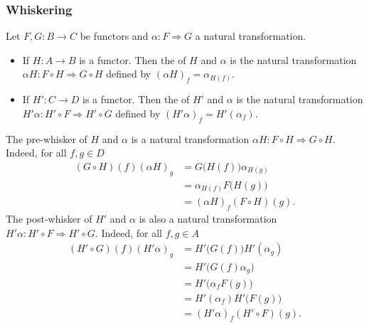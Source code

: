 \subsubsection{Whiskering}
\begin{definition}
Let $F,G: B\to C$ be functors and $\alpha: F\Rightarrow G$ a natural transformation.
\begin{itemize}
\item If $H: A\to B$ is a functor. Then the  of $H$ and $\alpha$ is the natural transformation $\alpha H: F\circ H\Rightarrow G\circ H$ defined by $(\alpha H)_f = \alpha_{H(f)}$.
\item If $H': C\to D$ is a functor. Then the  of $H'$ and $\alpha$ is the natural transformation $H'\alpha: H'\circ F\Rightarrow H'\circ G$ defined by $(H'\alpha)_f = H'(\alpha_f)$.
\end{itemize}
\end{definition}
The pre-whisker of $H$ and $\alpha$ is a natural transformation $\alpha H: F\circ H\Rightarrow G\circ H$. Indeed, for all $f,g\in D$
\begin{align*}
(G\circ H)(f)(\alpha H)_g &= G\big(H(f)\big)\alpha_{H(g)} \\
&= \alpha_{H(f)}F\big(H(g)\big) \\
&= (\alpha H)_f(F\circ H)(g) .
\end{align*}
The post-whisker of $H'$ and $\alpha$ is also a natural transformation $H'\alpha: H'\circ F\Rightarrow H'\circ G$. Indeed, for all $f,g\in A$
\begin{align*}
(H'\circ G)(f)(H'\alpha)_g &= H'\big(G(f)\big)H'(\alpha_g) \\
&= H'\big(G(f)\alpha_g\big) \\
&= H'\big(\alpha_f F(g)\big) \\
&= H'(\alpha_f)H'\big(F(g)\big) \\
&= (H'\alpha)_f(H'\circ F)(g).
\end{align*}

